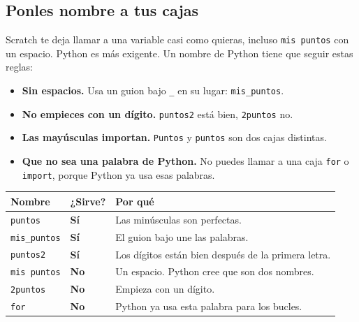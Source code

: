 \subsection*{Ponles nombre a tus cajas}

Scratch te deja llamar a una variable casi como quieras, incluso \texttt{mis puntos} con un espacio. Python es más exigente. Un nombre de Python tiene que seguir estas reglas:

\begin{itemize}
  \item \textbf{Sin espacios.} Usa un guion bajo \texttt{\_} en su lugar: \texttt{mis\_puntos}.
  \item \textbf{No empieces con un dígito.} \texttt{puntos2} está bien, \texttt{2puntos} no.
  \item \textbf{Las mayúsculas importan.} \texttt{Puntos} y \texttt{puntos} son dos cajas distintas.
  \item \textbf{Que no sea una palabra de Python.} No puedes llamar a una caja \texttt{for} o \texttt{import}, porque Python ya usa esas palabras.
\end{itemize}

\begin{center}
\renewcommand{\arraystretch}{1.35}
\begin{tabular}{P{3.6cm} P{1.8cm} P{8.2cm}}
\toprule
\textbf{Nombre} & \textbf{¿Sirve?} & \textbf{Por qué} \\
\midrule
\texttt{puntos} & \textcolor{chalframe}{\textbf{Sí}} & Las minúsculas son perfectas. \\
\texttt{mis\_puntos} & \textcolor{chalframe}{\textbf{Sí}} & El guion bajo une las palabras. \\
\texttt{puntos2} & \textcolor{chalframe}{\textbf{Sí}} & Los dígitos están bien después de la primera letra. \\
\texttt{mis puntos} & \textcolor{errframe}{\textbf{No}} & Un espacio. Python cree que son dos nombres. \\
\texttt{2puntos} & \textcolor{errframe}{\textbf{No}} & Empieza con un dígito. \\
\texttt{for} & \textcolor{errframe}{\textbf{No}} & Python ya usa esta palabra para los bucles. \\
\bottomrule
\end{tabular}
\end{center}

